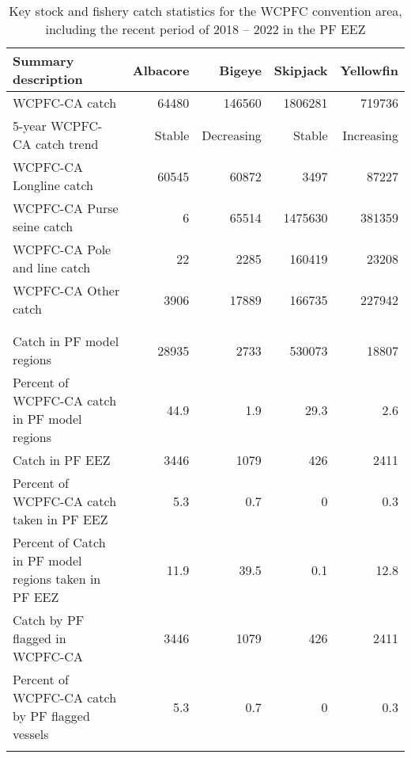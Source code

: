 \begin{longtable}{lrrrr}
\caption{Key stock and fishery catch statistics for the WCPFC convention area, including the recent period of 2018 -- 2022 in the PF EEZ} \\ 
  \hline
Summary description & Albacore & Bigeye & Skipjack & Yellowfin \\ 
  \hline
WCPFC-CA catch & 64480 & 146560 & 1806281 & 719736 \\ 
  5-year WCPFC-CA catch trend & Stable & Decreasing & Stable & Increasing \\ 
  WCPFC-CA Longline catch & 60545 & 60872 & 3497 & 87227 \\ 
  WCPFC-CA Purse seine catch & 6 & 65514 & 1475630 & 381359 \\ 
  WCPFC-CA Pole and line catch & 22 & 2285 & 160419 & 23208 \\ 
  WCPFC-CA Other catch & 3906 & 17889 & 166735 & 227942 \\ 
   &  &  &  &  \\ 
   &  &  &  &  \\ 
   \hline
Catch in PF model regions & 28935 & 2733 & 530073 & 18807 \\ 
  Percent of WCPFC-CA catch in PF model regions & 44.9 & 1.9 & 29.3 & 2.6 \\ 
  Catch in PF EEZ & 3446 & 1079 & 426 & 2411 \\ 
  Percent of WCPFC-CA catch taken in PF EEZ & 5.3 & 0.7 & 0 & 0.3 \\ 
  Percent of Catch in PF model regions taken in PF EEZ & 11.9 & 39.5 & 0.1 & 12.8 \\ 
  Catch by PF flagged in WCPFC-CA & 3446 & 1079 & 426 & 2411 \\ 
  Percent of WCPFC-CA catch by PF flagged vessels & 5.3 & 0.7 & 0 & 0.3 \\ 
  \hline
\label{cat_sum_tab}
\end{longtable}

